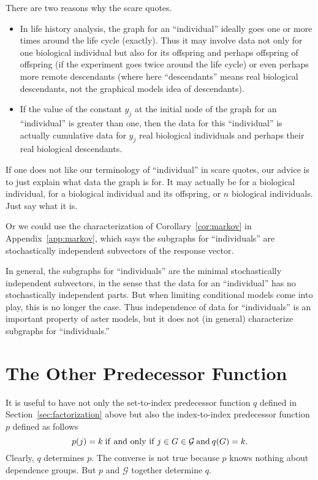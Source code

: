 There are two reasons why the scare quotes.
\begin{itemize}
\item In life history
analysis, the graph for an ``individual'' ideally goes one or more times
around the life cycle (exactly).  Thus it may involve data not only for
one biological individual but also for its offspring and perhaps offspring
of offspring (if the experiment goes twice around the life cycle) or even
perhaps more remote descendants (where here ``descendants'' means real
biological descendants, not the graphical models idea of descendants).
\item If the value of the constant $y_j$ at the initial node of the
graph for an ``individual'' is greater than one, then the data for this
``individual'' is actually cumulative data for $y_j$ real biological
individuals and perhaps their real biological descendants.
\end{itemize}


If one does not like our terminology of ``individual'' in scare quotes,
our advice is to just explain what data the graph is for.  It may actually
be for a biological individual, for a biological individual
and its offspring, or $n$ biological individuals.  Just say what it is.

Or we could use the characterization of Corollary~\ref{cor:markov} in
Appendix~\ref{app:markov}, which says the subgraphs for ``individuals''
are stochastically independent subvectors of the response vector.

In general, the subgraphs for ``individuals'' are the minimal stochastically
independent subvectors, in the sense that the data for an ``individual'' has
no stochastically independent parts.  But when limiting conditional models
come into play, this is no longer the case.
Thus independence of data for ``individuals'' is an important property of
aster models, but it does not (in general) characterize
subgraphs for ``individuals.''

\section{The Other Predecessor Function}
\label{sec:other}

It is useful to have not only the set-to-index predecessor function $q$
defined in Section~\ref{sec:factorization} above but also the index-to-index
predecessor function $p$ defined as follows
$$
   p(j) = k \mathrel{\rm if\ and\ only\ if} j \in G \in \mathcal{G} \mathbin{\rm and} q(G) = k.
$$
Clearly, $q$ determines $p$.
The converse is not true because $p$ knows nothing about dependence groups.
But $p$ and $\mathcal{G}$ together determine $q$.

